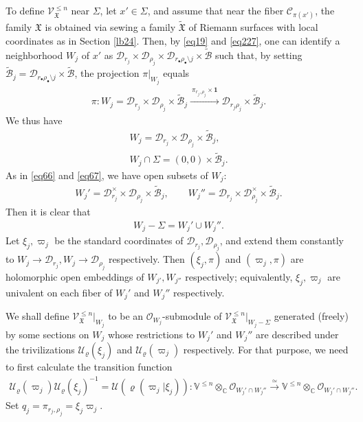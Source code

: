 \documentclass[12pt,a4paper,notitlepage]{report}
\theoremstyle{definition}
\theoremstyle{plain}
\newcommand{\fk}{\mathfrak}
\newcommand{\mc}{\mathcal}
\newcommand{\wtd}{\widetilde}
\newcommand{\id}{\mathbf{1}}
\newcommand{\scr}{\mathscr}
\newcommand{\Vbb}{\mathbb V}
\newcommand{\Cbb}{\mathbb C}
\numberwithin{equation}{section}
\begin{document}
To define $\scr V_{\fk X}^{\leq n}$ near $\Sigma$, let $x'\in\Sigma$, and assume that near the fiber $\mc C_{\pi(x')}$, the family $\fk X$ is obtained via sewing  a family $\wtd{\fk X}$ of Riemann surfaces with local coordinates  as in Section \ref{lb24}. Then, by \eqref{eq19} and \eqref{eq227}, one can identify a neighborhood $W_j$ of $x'$ as $\mc D_{r_j}\times\mc D_{\rho_j}\times\mc D_{r_\bullet\rho_\bullet\setminus j}\times\wtd{\mc B}$ such that, by setting $\wtd {\mc B}_j=\mc D_{r_\bullet\rho_\bullet\setminus j}\times\wtd{\mc B}$, the projection $\pi|_{W_j}$ equals
\begin{align}
\pi:W_j=\mc D_{r_j}\times\mc D_{\rho_j}\times\wtd{\mc B}_j\xrightarrow{~\pi_{r_j,\rho_j}\times\id~} \mc D_{r_j\rho_j}\times\wtd{\mc B}_j.\label{eq69}
\end{align}
We thus have
\begin{gather}
W_j=\mc D_{r_j}\times\mc D_{\rho_j}\times\wtd{\mc B}_j,\label{eq115}\\
W_j\cap\Sigma=(0,0)\times\wtd{\mc B}_j.\nonumber
\end{gather}
As in \eqref{eq66} and \eqref{eq67}, we have open subsets of $W_j$:
\begin{gather*}
W_j'=\mc D_{r_j}^\times\times\mc D_{\rho_j}\times\wtd{\mc B}_j,\qquad W_j''=\mc D_{r_j}\times\mc D_{\rho_j}^\times\times\wtd{\mc B}_j.
\end{gather*}
Then it is clear that
\begin{align*}
W_j-\Sigma=W_j'\cup W_j''.
\end{align*}
Let $\xi_j,\varpi_j$ be the standard coordinates of $\mc D_{r_j},\mc D_{\rho_j}$, and extend them constantly to $W_j\rightarrow\mc D_{r_j},W_j\rightarrow\mc D_{\rho_j}$ respectively. Then $(\xi_j,\pi)$ and $(\varpi_j,\pi)$ are holomorphic open embeddings of $W_{j'},W_{j''}$ respectively; equivalently, $\xi_j,\varpi_j$ are univalent on each fiber of $W_j'$ and $W_j''$ respectively.



We shall define $\scr V^{\leq n}_{\fk X}|_{W_j}$ to be an $\scr O_{W_j}$-submodule of $\scr V_{\fk X}^{\leq n}|_{W_j-\Sigma}$ generated (freely) by some sections on $W_j$ whose restrictions to $W_j'$ and $W_j''$ are described under the trivilizations $\mc U_\varrho(\xi_j)$ and $\mc U_\varrho(\varpi_j)$ respectively. For that purpose, we need to first calculate the transition function \begin{align*}
\mc U_\varrho(\varpi_j)\mc U_\varrho(\xi_j)^{-1}=\mc U(\varrho(\varpi_j|\xi_j)):\Vbb^{\leq n}\otimes_{\Cbb}\scr O_{W_j'\cap W_j''}\xrightarrow{\simeq} \Vbb^{\leq n}\otimes_{\Cbb}\scr O_{W_j'\cap W_j''}.
\end{align*}
Set $q_j=\pi_{r_j,\rho_j}=\xi_j\varpi_j$. 
\end{document}
